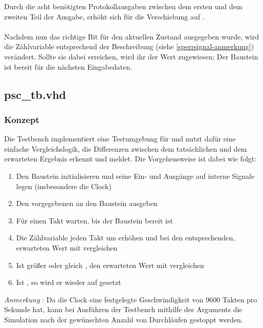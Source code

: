 \documentclass[a4paper]{article}
\begin{document}
        Durch die acht benötigten Protokollausgaben zwischen dem ersten und dem zweiten Teil der Ausgabe, erhöht sich für  die Verschiebung auf .\\ \\
		Nachdem nun das richtige Bit für den aktuellen Zustand ausgegeben wurde, wird die Zählvariable entsprechend der Beschreibung (siehe \ref{sperrsignal-anmerkung}) verändert.
		Sollte sie dabei  erreichen, wird ihr der Wert  zugewiesen; Der Baustein ist bereit für die nächsten Eingabedaten.
        		
        
        \subsection{psc_tb.vhd}
        
        	\subsubsection{Konzept}
				Die Testbench implementiert eine Testumgebung für  und nutzt dafür eine einfache Vergleichslogik, 
				die Differenzen zwischen dem tatsächlichen und dem erwarteten Ergebnis erkennt und meldet. Die Vorgehensweise ist dabei wie folgt:\\
        		\begin{enumerate}
        			\item Den Baustein initialisieren und seine Ein- und Ausgänge auf interne Signale legen (insbesondere die Clock)
        			\item Den vorgegebenen  an den Baustein ausgeben
        			\item Für einen Takt warten, bis der Baustein bereit ist
        			\item Die Zählvariable jeden Takt um  erhöhen und bei  den entsprechenden, erwarteten Wert mit  vergleichen
        			\item Ist  größer oder gleich , den erwarteten Wert mit  vergleichen
        			\item Ist , so wird er wieder auf  gesetzt
        		\end{enumerate}
			\emph{Anmerkung} \label{stop-time-anmerkung}: Da die Clock eine festgelegte Geschwindigkeit von 9600 Takten pro Sekunde hat, 
			kann bei Ausführen der Testbench mithilfe des Arguments  die Simulation nach der gewünschten Anzahl von Durchläufen gestoppt werden.
        	
\end{document}

